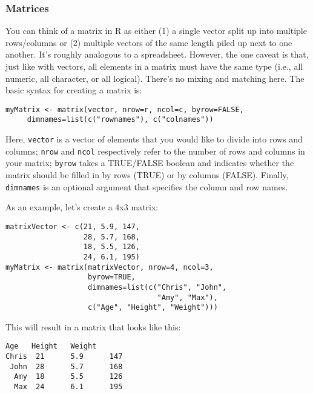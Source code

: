\subsubsection{Matrices}
You can think of a matrix in R as either (1) a single vector split up into multiple rows/columns or (2) multiple vectors of the same length piled up next to one another. It's roughly analogous to a spreadsheet. However, the one caveat is that, just like with vectors, all elements in a matrix must have the same type (i.e., all numeric, all character, or all logical). There's no mixing and matching here. The basic syntax for creating a matrix is:

\begin{framed}
\begin{Verbatim}[samepage=TRUE]
myMatrix <- matrix(vector, nrow=r, ncol=c, byrow=FALSE, 
     dimnames=list(c("rownames"), c("colnames"))
\end{Verbatim}
\end{framed}

Here, \verb|vector| is a vector of elements that you would like to divide into rows and columns; \verb|nrow| and \verb|ncol| respectively refer to the number of rows and columns in your matrix; \verb|byrow| takes a TRUE/FALSE boolean and indicates whether the matrix should be filled in by rows (TRUE) or by columns (FALSE). Finally, \verb|dimnames| is an optional argument that specifies the column and row names.

As an example, let's create a 4x3 matrix:

\begin{framed}
\begin{Verbatim}[samepage=TRUE]
matrixVector <- c(21, 5.9, 147,
                  28, 5.7, 168,
                  18, 5.5, 126,
                  24, 6.1, 195)
myMatrix <- matrix(matrixVector, nrow=4, ncol=3,
                   byrow=TRUE,
                   dimnames=list(c("Chris", "John",
                                   "Amy", "Max"),
                   c("Age", "Height", "Weight")))
\end{Verbatim}
\end{framed}

This will result in a matrix that looks like this:

\begin{framed}
\begin{Verbatim}[samepage=TRUE]
      Age   Height   Weight
Chris  21      5.9      147
 John  28      5.7      168
  Amy  18      5.5      126
  Max  24      6.1      195
\end{Verbatim}
\end{framed}

